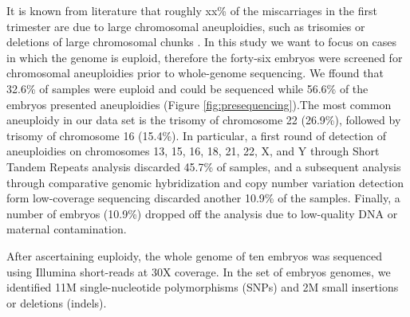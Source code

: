 It is known from literature that roughly xx\% of the miscarriages in the first trimester are due to large chromosomal aneuploidies, such as trisomies or deletions of large chromosomal chunks \cite{goddijn2000genetic,zhang2009genetic}. In this study we want to focus on cases in which the genome is euploid, therefore the forty-six embryos were screened for chromosomal aneuploidies prior to whole-genome sequencing. We ffound that 32.6\% of samples were euploid and could be sequenced while 56.6\% of the embryos presented aneuploidies (Figure \ref{fig:presequencing}).The most common aneuploidy in our data set is the trisomy of chromosome 22 (26.9\%), followed by trisomy of chromosome 16 (15.4\%). In particular, a first round of detection of aneuploidies on chromosomes 13, 15, 16, 18, 21, 22, X, and Y through Short Tandem Repeats analysis discarded 45.7\% of samples, %
and a subsequent analysis through comparative genomic hybridization and copy number variation detection form low-coverage sequencing discarded another 10.9\% of the samples. Finally, a number of embryos (10.9\%) dropped off the analysis due to low-quality DNA or maternal contamination. 

After ascertaining euploidy, %
the whole genome of ten embryos was sequenced using Illumina short-reads at 30X coverage. In the set of embryos genomes, we identified 11M single-nucleotide polymorphisms (SNPs) and 2M small insertions or deletions (indels).%


